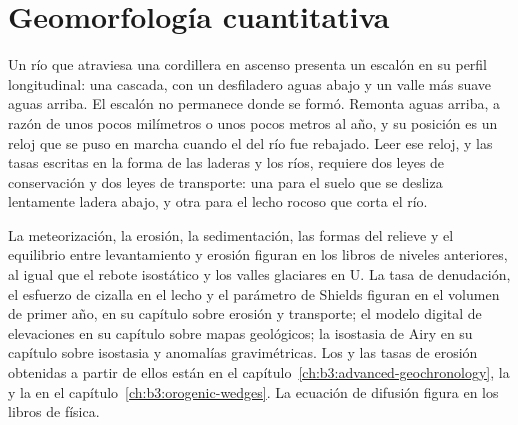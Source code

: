 \chapter{Geomorfología cuantitativa}\label{ch:b3:quantitative-geomorphology}

Un río que atraviesa una cordillera en ascenso presenta un escalón en su perfil longitudinal: una cascada,
con un desfiladero aguas abajo y un valle más suave aguas arriba. El escalón no permanece
donde se formó. Remonta aguas arriba, a razón de unos pocos milímetros o unos pocos metros al
año, y su posición es un reloj que se puso en marcha cuando el  del río
fue rebajado. Leer ese reloj, y las tasas escritas en la forma de las laderas
y los ríos, requiere dos leyes de conservación y dos leyes de transporte: una para el
suelo que se desliza lentamente ladera abajo, y otra para el lecho rocoso que corta el río.

\begin{recall}
La meteorización, la erosión, la sedimentación, las formas del relieve y el equilibrio entre levantamiento
y erosión figuran en los libros de niveles anteriores, al igual que el rebote isostático y los
valles glaciares en U. La tasa de denudación, el esfuerzo de cizalla en el lecho y el parámetro de Shields
figuran en el volumen de primer año, en su capítulo sobre erosión y transporte;
el modelo digital de elevaciones en su capítulo sobre mapas geológicos; la
isostasia de Airy en su capítulo sobre isostasia y anomalías gravimétricas. Los
 y las tasas de erosión obtenidas a partir de ellos están en
el capítulo~\ref{ch:b3:advanced-geochronology}, la  y la
 en el capítulo~\ref{ch:b3:orogenic-wedges}. La
ecuación de difusión figura en los libros de física.
\end{recall}

